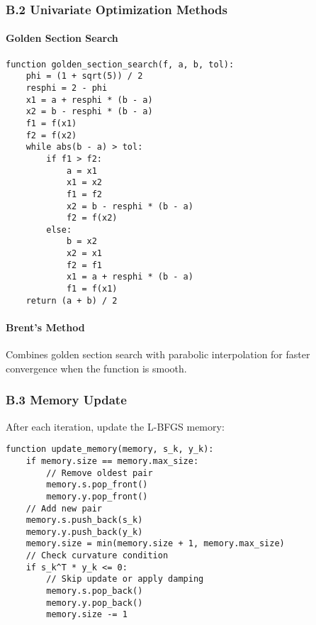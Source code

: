 \hypertarget{b.2-univariate-optimization-methods}{%
\subsubsection{B.2 Univariate Optimization Methods}\label{b.2-univariate-optimization-methods}}

\hypertarget{golden-section-search}{%
\paragraph{Golden Section Search}\label{golden-section-search}}

\begin{verbatim}
function golden_section_search(f, a, b, tol):
    phi = (1 + sqrt(5)) / 2
    resphi = 2 - phi
    x1 = a + resphi * (b - a)
    x2 = b - resphi * (b - a)
    f1 = f(x1)
    f2 = f(x2)
    while abs(b - a) > tol:
        if f1 > f2:
            a = x1
            x1 = x2
            f1 = f2
            x2 = b - resphi * (b - a)
            f2 = f(x2)
        else:
            b = x2
            x2 = x1
            f2 = f1
            x1 = a + resphi * (b - a)
            f1 = f(x1)
    return (a + b) / 2
\end{verbatim}

\hypertarget{brents-method}{%
\paragraph{Brent's Method}\label{brents-method}}

Combines golden section search with parabolic interpolation for faster convergence when the function is smooth.

\hypertarget{b.3-memory-update}{%
\subsubsection{B.3 Memory Update}\label{b.3-memory-update}}

After each iteration, update the L-BFGS memory:

\begin{verbatim}
function update_memory(memory, s_k, y_k):
    if memory.size == memory.max_size:
        // Remove oldest pair
        memory.s.pop_front()
        memory.y.pop_front()
    // Add new pair
    memory.s.push_back(s_k)
    memory.y.push_back(y_k)
    memory.size = min(memory.size + 1, memory.max_size)
    // Check curvature condition
    if s_k^T * y_k <= 0:
        // Skip update or apply damping
        memory.s.pop_back()
        memory.y.pop_back()
        memory.size -= 1
\end{verbatim}

